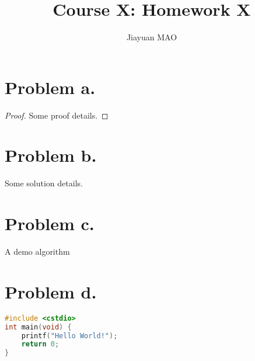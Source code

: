 \documentclass[a4paper, 12pt]{article}
\begin{document}
\setlength{\parindent}{2em}

\title{Course X: Homework X}
\author{Jiayuan MAO} 
\date{}
\maketitle

% 

\section{Problem a.}
\begin{proof}
    Some proof details.
\end{proof}

\section{Problem b.}
\begin{solution}
    Some solution details.
\end{solution}

\section{Problem c.}
\begin{algorithm}[!htbp]
    \caption{A demo algorithm}
\end{algorithm}

\section{Problem d.}
\begin{lstlisting}[language=c++]
#include <cstdio>
int main(void) {
    printf("Hello World!");
    return 0;
}
\end{lstlisting}
\end{document}
